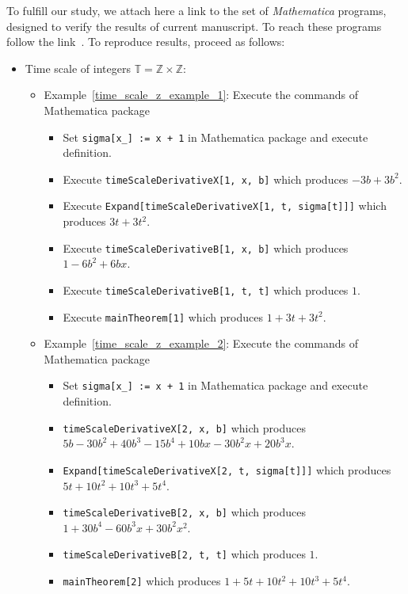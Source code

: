 To fulfill our study, we attach here a link to the set of \emph{Mathematica} programs, designed to verify the results
of current manuscript.
To reach these programs follow the link~\cite{kolosov2022mathematica}.
To reproduce results, proceed as follows:
\begin{itemize}
    \setlength\itemsep{1em}
    \item Time scale of integers $\mathbb{T} = \mathbb{Z} \times \mathbb{Z}$:
    \begin{itemize}
        \setlength\itemsep{0.5em}
        \item Example~\ref{time_scale_z_example_1}:
        Execute the commands of Mathematica package
        \begin{itemize}
            \item Set \texttt{sigma[x\_] := x + 1} in Mathematica package and execute definition.
            \item Execute \texttt{timeScaleDerivativeX[1, x, b]} which produces $-3 b + 3 b^2$.
            \item Execute \texttt{Expand[timeScaleDerivativeX[1, t, sigma[t]]]} which produces $3 t + 3 t^2$.
            \item Execute \texttt{timeScaleDerivativeB[1, x, b]} which produces $1 - 6 b^2 + 6 b x$.
            \item Execute \texttt{timeScaleDerivativeB[1, t, t]} which produces $1$.
            \item Execute \texttt{mainTheorem[1]} which produces $1 + 3 t + 3 t^2$.
        \end{itemize}
        \item Example~\ref{time_scale_z_example_2}:
        Execute the commands of Mathematica package
        \begin{itemize}
            \item Set \texttt{sigma[x\_] := x + 1} in Mathematica package and execute definition.
            \item \texttt{timeScaleDerivativeX[2, x, b]} which produces
            $5 b - 30 b^2 + 40 b^3 - 15 b^4 + 10 b x - 30 b^2 x + 20 b^3 x$.
            \item \texttt{Expand[timeScaleDerivativeX[2, t, sigma[t]]]} which produces $5 t + 10 t^2 + 10 t^3 + 5 t^4$.
            \item \texttt{timeScaleDerivativeB[2, x, b]} which produces $1 + 30 b^4 - 60 b^3 x + 30 b^2 x^2$.
            \item \texttt{timeScaleDerivativeB[2, t, t]} which produces $1$.
            \item \texttt{mainTheorem[2]} which produces $1 + 5 t + 10 t^2 + 10 t^3 + 5 t^4$.

\end{itemize}
\end{itemize}
\end{itemize}

